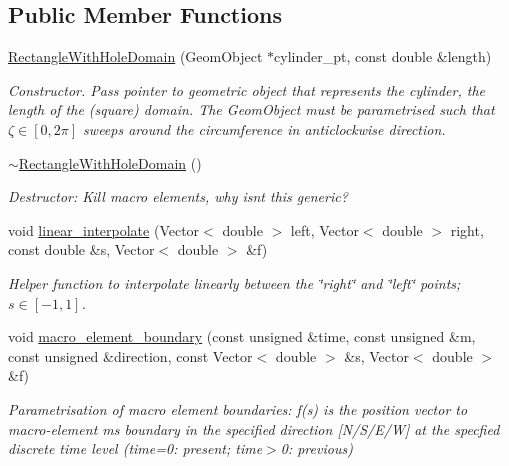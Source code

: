 \subsection*{Public Member Functions}
\begin{DoxyCompactItemize}
\item 
\hyperlink{classoomph_1_1RectangleWithHoleDomain_a3c685f6d35bb842d50062ccaa63a5486}{Rectangle\+With\+Hole\+Domain} (Geom\+Object $\ast$cylinder\+\_\+pt, const double \&length)
\begin{DoxyCompactList}\small\item\em Constructor. Pass pointer to geometric object that represents the cylinder, the length of the (square) domain. The Geom\+Object must be parametrised such that $\zeta \in [0,2\pi]$ sweeps around the circumference in anticlockwise direction. \end{DoxyCompactList}\item 
\hyperlink{classoomph_1_1RectangleWithHoleDomain_adae7fabe3167ec35c1c0d4af813a4dca}{$\sim$\+Rectangle\+With\+Hole\+Domain} ()
\begin{DoxyCompactList}\small\item\em Destructor\+: Kill macro elements, why isn\textquotesingle{}t this generic? \end{DoxyCompactList}\item 
void \hyperlink{classoomph_1_1RectangleWithHoleDomain_a9548ab705821b22c43850b658a893fd8}{linear\+\_\+interpolate} (Vector$<$ double $>$ left, Vector$<$ double $>$ right, const double \&s, Vector$<$ double $>$ \&f)
\begin{DoxyCompactList}\small\item\em Helper function to interpolate linearly between the \char`\"{}right\char`\"{} and \char`\"{}left\char`\"{} points; $ s \in [-1,1] $. \end{DoxyCompactList}\item 
void \hyperlink{classoomph_1_1RectangleWithHoleDomain_a514085f80059aa9f0cc3334a3cb408c1}{macro\+\_\+element\+\_\+boundary} (const unsigned \&time, const unsigned \&m, const unsigned \&direction, const Vector$<$ double $>$ \&s, Vector$<$ double $>$ \&f)
\begin{DoxyCompactList}\small\item\em Parametrisation of macro element boundaries\+: f(s) is the position vector to macro-\/element m\textquotesingle{}s boundary in the specified direction \mbox{[}N/\+S/\+E/W\mbox{]} at the specfied discrete time level (time=0\+: present; time$>$0\+: previous) \end{DoxyCompactList}\end{DoxyCompactItemize}
